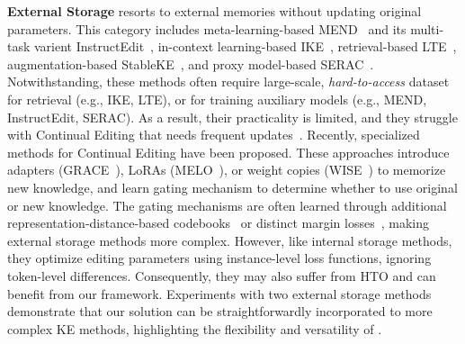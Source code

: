 \textbf{External Storage} resorts to external memories without updating original parameters. 
This category includes meta-learning-based MEND~\citep{mitchell2021fast} and its multi-task varient InstructEdit~\citep{zhang2024instructedit}, 
in-context learning-based IKE~\citep{zheng2023can}, retrieval-based LTE~\citep{jiang2024learning}, augmentation-based StableKE~\citep{wei2024stable}, and proxy model-based SERAC~\citep{mitchell2022memory}.
Notwithstanding, these methods often require large-scale, \textit{hard-to-access} dataset for retrieval (e.g., IKE, LTE),
or for training auxiliary models (e.g., MEND, InstructEdit, SERAC). 
As a result, their practicality is limited, and they struggle with Continual Editing that needs frequent updates~\citep{wang2024wise}.
Recently, specialized methods for Continual Editing have been proposed.
These approaches introduce adapters (GRACE~\citep{hartvigsen2024aging}), LoRAs (MELO~\citep{yu2024melo}), or weight copies (WISE~\citep{wang2024wise}) to memorize new knowledge, and learn gating mechanism to determine whether to use original or new knowledge.
The gating mechanisms are often learned through additional representation-distance-based codebooks~\citep{yu2024melo} or distinct margin losses~\citep{wang2024wise}, making external storage methods more complex. 
However, like internal storage methods, they optimize editing parameters using instance-level loss functions, ignoring token-level differences.
Consequently, they may also suffer from HTO and can benefit from our {\NAME} framework.
Experiments with two external storage methods demonstrate that our solution can be straightforwardly incorporated to more complex KE methods, highlighting 
the flexibility and versatility of {\NAME}.
